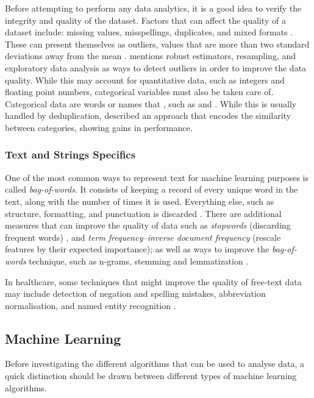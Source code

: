 \documentclass[a4paper,12pt]{article}
\begin{document}
Before attempting to perform any data analytics, it is a good idea to verify the integrity and quality of the dataset. Factors that can affect the quality of a dataset include: missing values, misspellings, duplicates, and mixed formats \parencite{Chu2016}. These can present themselves as outliers, values that are more than two standard deviations away from the mean \parencite{Hellerstein2008}. \textcite{Hellerstein2008} mentions robust estimators, resampling, and exploratory data analysis as ways to detect outliers in order to improve the data quality. While this may account for quantitative data, such as integers and floating point numbers, categorical variables must also be taken care of. Categorical data are words or names that , such as  and .
While this is usually handled by deduplication, \textcite{Cerda2018} described an approach that encodes the similarity between categories, showing gains in performance.

\subsubsection{Text and Strings Specifics}

One of the most common ways to represent text for machine learning purposes is called \textit{bag-of-words}.
It consists of keeping a record of every unique word in the text, along with the number of times it is used.
Everything else, such as structure, formatting, and punctuation is discarded \parencite[327]{Mueller2017}.
There are additional measures that can improve the quality of data such as \textit{stopwords} (discarding frequent words) \parencite[327-336]{Mueller2017}, and \textit{term frequency–inverse document frequency} (rescale features by their expected importance);
as well as ways to improve the \textit{bag-of-words} technique, such as n-grams, stemming and lemmatization \parencite[339,344]{Mueller2017}.

In healthcare, some techniques that might improve the quality of free-text data may include detection of negation and spelling mistakes, abbreviation normalisation, and named entity recognition \parencite{Dalianis2015}.

\subsection{Machine Learning}

Before investigating the different algorithms that can be used to analyse data, a quick distinction should be drawn between different types of machine learning algorithms.
\end{document}

